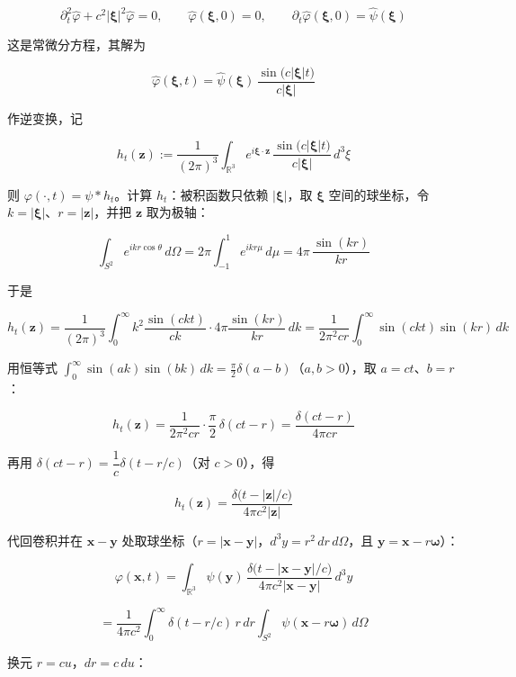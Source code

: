 \documentclass[
  chinese,
  a4paper,
  UTF8,
  12pt,
  oneside,
  openany]{ctexbook}
\theoremstyle{plain}
\theoremstyle{plain}
\theoremstyle{plain}
\theoremstyle{definition}
\theoremstyle{plain}
\theoremstyle{plain}
\theoremstyle{remark}
\begin{document}
\[
\partial_{t}^{2}\widehat{\varphi}+c^{2}|\boldsymbol{\xi}|^{2}\widehat{\varphi}=0,\qquad
\widehat{\varphi}(\boldsymbol{\xi},0)=0,\qquad \partial_{t}\widehat{\varphi}(\boldsymbol{\xi},0)=\widehat{\psi}(\boldsymbol{\xi})
\]

这是常微分方程，其解为

\[
\widehat{\varphi}(\boldsymbol{\xi},t)=\widehat{\psi}(\boldsymbol{\xi})\,\frac{\sin\bigl(c|\boldsymbol{\xi}|t\bigr)}{c|\boldsymbol{\xi}|}
\]

作逆变换，记

\[
h_{t}(\mathbf{z}):=\frac{1}{(2\pi)^{3}}\int_{\mathbb{R}^{3}}e^{i\boldsymbol{\xi}\cdot\mathbf{z}}\,
\frac{\sin\bigl(c|\boldsymbol{\xi}|t\bigr)}{c|\boldsymbol{\xi}|}\,d^{3}\xi
\]

则 \(\varphi(\cdot,t)=\psi*h_{t}\)。计算 \(h_{t}\)：被积函数只依赖
\(|\boldsymbol{\xi}|\)，取 \(\boldsymbol{\xi}\) 空间的球坐标，令
\(k=|\boldsymbol{\xi}|\)、\(r=|\mathbf{z}|\)，并把 \(\mathbf{z}\)
取为极轴：

\[
\int_{S^{2}}e^{ikr\cos\theta}\,d\Omega=2\pi\int_{-1}^{1}e^{ikr\mu}\,d\mu=4\pi\,\frac{\sin(kr)}{kr}
\]

于是

\[
h_{t}(\mathbf{z})=\frac{1}{(2\pi)^{3}}\int_{0}^{\infty}k^{2}\frac{\sin(ckt)}{ck}\cdot 4\pi\frac{\sin(kr)}{kr}\,dk
=\frac{1}{2\pi^{2}cr}\int_{0}^{\infty}\sin(ckt)\sin(kr)\,dk
\]

用恒等式
\(\int_{0}^{\infty}\sin(ak)\sin(bk)\,dk=\frac{\pi}{2}\delta(a-b)\)（\(a,b>0\)），取
\(a=ct\)、\(b=r\)：

\[
h_{t}(\mathbf{z})=\frac{1}{2\pi^{2}cr}\cdot\frac{\pi}{2}\,\delta(ct-r)
=\frac{\delta(ct-r)}{4\pi cr}
\]

再用 \(\delta(ct-r)=\dfrac{1}{c}\delta(t-r/c)\)（对 \(c>0\)），得

\[
h_{t}(\mathbf{z})=\frac{\delta\bigl(t-|\mathbf{z}|/c\bigr)}{4\pi c^{2}|\mathbf{z}|}
\]

代回卷积并在 \(\mathbf{x}-\mathbf{y}\)
处取球坐标（\(r=|\mathbf{x}-\mathbf{y}|\)，\(d^{3}y=r^{2}\,dr\,d\Omega\)，且
\(\mathbf{y}=\mathbf{x}-r\boldsymbol{\omega}\)）：

\[
\varphi(\mathbf{x},t)=\int_{\mathbb{R}^{3}}\psi(\mathbf{y})\,\frac{\delta\bigl(t-|\mathbf{x}-\mathbf{y}|/c\bigr)}{4\pi c^{2}|\mathbf{x}-\mathbf{y}|}\,d^{3}y
\]

\[
=\frac{1}{4\pi c^{2}}\int_{0}^{\infty}\delta(t-r/c)\,r\,dr\int_{S^{2}}\psi(\mathbf{x}-r\boldsymbol{\omega})\,d\Omega
\]

换元 \(r=cu\)，\(dr=c\,du\)：
\end{document}
